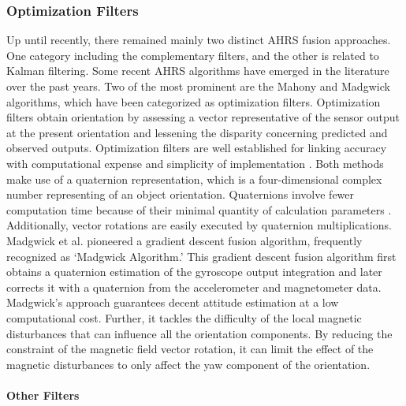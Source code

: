 \subsubsection{Optimization Filters}

Up until recently, there remained mainly two distinct AHRS fusion approaches. One category including the complementary filters, and the other is related to Kalman filtering. Some recent AHRS algorithms have emerged in the literature over the past years. Two of the most prominent are the Mahony and Madgwick algorithms, which have been categorized as optimization filters. Optimization filters obtain orientation by assessing a vector representative of the sensor output at the present orientation and lessening the disparity concerning predicted and observed outputs. Optimization filters are well established for linking accuracy with computational expense and simplicity of implementation \cite{madgwick2020extended}.
Both methods make use of a quaternion representation, which is a four-dimensional complex number representing of an object orientation. Quaternions involve fewer computation time because of their minimal quantity of calculation parameters \cite{ludwig2018comparison}. Additionally, vector rotations are easily executed by quaternion multiplications.
Madgwick et al. \cite{madgwick2010efficient} pioneered a gradient descent fusion algorithm, frequently recognized as ‘Madgwick Algorithm.' This gradient descent fusion algorithm first obtains a quaternion estimation of the gyroscope output integration and later corrects it with a quaternion from the accelerometer and magnetometer data. Madgwick's approach guarantees decent attitude estimation at a low computational cost. Further, it tackles the difficulty of the local magnetic disturbances that can influence all the orientation components. By reducing the constraint of the magnetic field vector rotation, it can limit the effect of the magnetic disturbances to only affect the yaw component of the orientation.

\paragraph{Other Filters}
